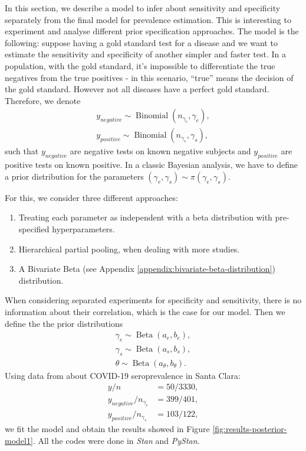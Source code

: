 In this section, we describe a model to infer about sensitivity 
and specificity separately from the final model for prevalence 
estimation. This is interesting 
to experiment and analyse different prior specification approaches. 
The model is the following: suppose having a gold standard 
test for a disease and we want to estimate the sensitivity and 
specificity of another simpler and faster test. In a population, 
with the gold standard, it's impossible to differentiate the true 
negatives from the true positives - in this scenario, ``true'' means 
the decision of the gold standard. However not all diseases have a 
perfect gold standard. Therefore, we denote 
\begin{gather*}
  y_{negative} \sim \operatorname{Binomial}(n_{\gamma_e}, \gamma_e), \\
  y_{positive} \sim \operatorname{Binomial}(n_{\gamma_s}, \gamma_s),
\end{gather*}
such that $y_{negative}$ are negative tests on known negative 
subjects and $y_{positive}$ are positive tests on
known positive. In a classic Bayesian analysis, we have to define a 
prior distribution for the parameters $(\gamma_e, \gamma_s) \sim \pi(\gamma_e,
\gamma_s)$. 

For this, we consider three different approaches: 

\begin{enumerate}
  \item Treating each parameter as independent with a beta distribution 
  with pre-specified hyperparameters. 
  \item Hierarchical partial pooling, when dealing with more studies. 
  \item A Bivariate Beta (see Appendix
  \ref{appendix:bivariate-beta-distribution}) 
  distribution.
\end{enumerate}

When considering separated experiments for specificity and
sensitivity, there is
no information about their correlation, which is the case for our model. Then we define the the prior distributions
\begin{gather*}
  \gamma_e \sim \operatorname{Beta}(a_e, b_e), \\
  \gamma_s \sim \operatorname{Beta}(a_s, b_s), \\
  \theta \sim \operatorname{Beta}(a_{\theta}, b_{\theta}).
\end{gather*} 
Using data from \cite{bennett2020estimating} about COVID-19 seroprevalence in
Santa Clara:  
\begin{align*}
  y/n &= 50/3330,\\
y_{negative}/n_{\gamma_e} &= 399/401, \\
y_{positive}/n_{\gamma_s} &= 103/122, 
\end{align*}
we fit the model and obtain the results showed in Figure
\ref{fig:results-posterior-model1}. All the codes were done in {\em Stan} and
{\em PyStan}.

